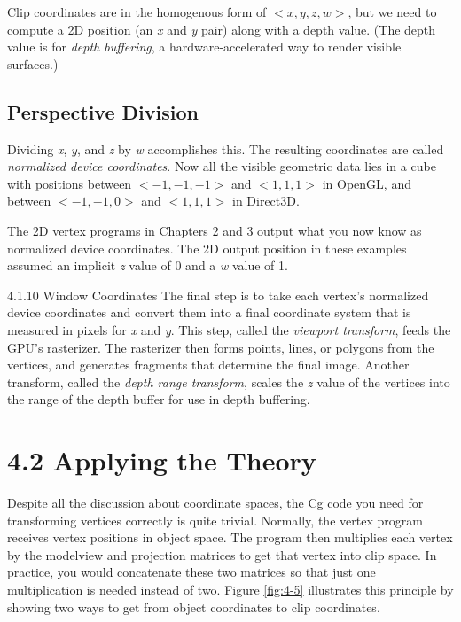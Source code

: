 \documentclass{book}
\begin{document}
Clip coordinates are in the homogenous form of $<x, y, z, w>$, but we need to compute a 2D position (an \textit{x} and \textit{y} pair) along with a depth value. (The depth value is for \textit{depth buffering}, a hardware-accelerated way to render visible surfaces.)

\subsection*{Perspective Division}

Dividing \textit{x}, \textit{y}, and \textit{z} by \textit{w} accomplishes this. The resulting coordinates are called \textit{normalized device coordinates}. Now all the visible geometric data lies in a cube with positions between $<-1, -1, -1>$ and $<1, 1, 1>$ in OpenGL, and between $<-1, -1, 0>$ and $<1, 1, 1>$ in Direct3D.

The 2D vertex programs in Chapters 2 and 3 output what you now know as normalized device coordinates. The 2D output position in these examples assumed an implicit \textit{z} value of 0 and a \textit{w} value of 1.

4.1.10 Window Coordinates
The final step is to take each vertex's normalized device coordinates and convert them into a final coordinate system that is measured in pixels for \textit{x} and \textit{y}. This step, called the \textit{viewport transform}, feeds the GPU's rasterizer. The rasterizer then forms points, lines, or polygons from the vertices, and generates fragments that determine the final image. Another transform, called the \textit{depth range transform}, scales the \textit{z} value of the vertices into the range of the depth buffer for use in depth buffering.

\section{4.2 Applying the Theory}

Despite all the discussion about coordinate spaces, the Cg code you need for transforming vertices correctly is quite trivial. Normally, the vertex program receives vertex positions in object space. The program then multiplies each vertex by the modelview and projection matrices to get that vertex into clip space. In practice, you would concatenate these two matrices so that just one multiplication is needed instead of two. Figure \ref{fig:4-5} illustrates this principle by showing two ways to get from object coordinates to clip coordinates.
\end{document}
